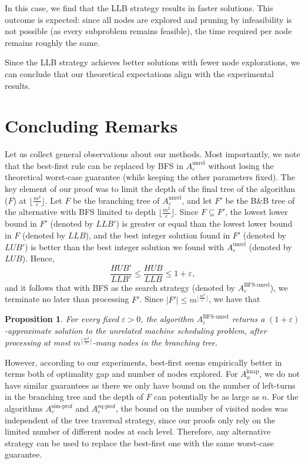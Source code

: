 \documentclass[moor,sglanonrev]{informs4}
\theoremstyle{plain}
\newtheorem{prop}{Proposition}  %
\begin{document}
In this case, we find that the LLB strategy results in faster solutions.  
This outcome is expected: since all nodes are explored and pruning by infeasibility is not possible (as every subproblem remains feasible), the time required per node remains roughly the same.  

Since the LLB strategy achieves better solutions with fewer node explorations, we can conclude that our theoretical expectations align with the experimental results.

\section{Concluding Remarks}\label{sec:conc}

Let us collect general observations about our methods. Most importantly, we note that the best-first rule can be replaced by BFS in $A^{\text{unrel}}_{\varepsilon}$ without losing the theoretical worst-case guarantee (while keeping the other parameters fixed). The key element of our proof was to limit the depth of the final tree of the algorithm ($F$) at $\lfloor\frac{m^2}{\varepsilon}\rfloor$. Let $F$ be the branching tree of $A^{\text{unrel}}_{\varepsilon}$, and let $F'$ be the B\&B tree of the alternative with BFS limited to depth $\lfloor\frac{m^2}{\varepsilon}\rfloor$. Since $F \subseteq F'$, the lowest lower bound in $F'$ (denoted by $LLB'$) is greater or equal than the lowest lower bound in $F$ (denoted by $LLB$), and the best integer solution found in $F'$ (denoted by $LUB'$) is better than the best integer solution we found with $A^{\text{unrel}}_{\varepsilon}$ (denoted by $LUB$). Hence,
\[
\frac{HUB'}{LLB'} \le \frac{HUB}{LLB}\le 1+\varepsilon,
\]
and it follows that with BFS as the search strategy (denoted by $A^{\text{BFS-unrel}}_{\varepsilon}$), we terminate no later than processing $F'$. Since $|F'|\le m^{\lfloor\frac{m^2}{\varepsilon}\rfloor}$, we have that

\begin{prop}\label{bfs}
    For every fixed $\varepsilon > 0$, the algorithm $A^{\text{BFS-unrel}}_{\varepsilon}$ returns a $(1+\varepsilon)$-approximate solution to the unrelated machine scheduling problem, after processing at most $m^{\lfloor\frac{m^2}{\varepsilon}\rfloor}$-many nodes in the branching tree.
\end{prop}

However, according to our experiments, best-first seems empirically better in terms both of optimality gap and number of nodes explored. For $A^{\text{knap}}_{\alpha}$, we do not have similar guarantees as there we only have bound on the number of left-turns in the branching tree and the depth of $F$ can potentially be as large as $n$. For the algorithms $A^{\text{sim-prof}}_{\varepsilon}$ and $A^{\text{eq-prof}}_{\varepsilon}$, the bound on the number of visited nodes was independent of the tree traversal strategy, since our proofs only rely on the limited number of different nodes at each level. Therefore, any alternative strategy can be used to replace the best-first one with the same worst-case guarantee.
\end{document}
